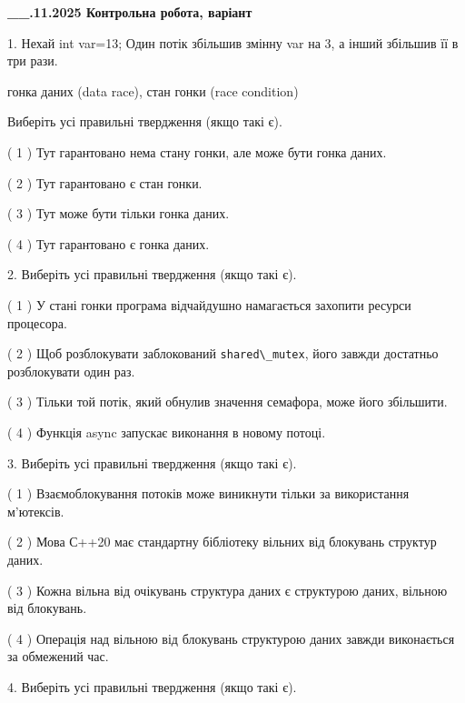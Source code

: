\documentclass[12pt, ukrainian]{article}
\def\code#1{\Verb!#1!}
\begin{document}
\newpage
\begin {large}

\textbf{\_\_.11.2025 Контрольна робота, варіант  }\par


{
1. Нехай int var=13; Один потік збільшив змінну var на 3, а інший збільшив її в три рази.

гонка даних (data race), стан гонки (race condition)

Виберіть усі правильні твердження (якщо такі є).\par
\vspace{2mm}
( 1 ) Тут гарантовано нема стану гонки, але може бути гонка даних.%

( 2 ) Тут гарантовано є стан гонки.%

( 3 ) Тут може бути тільки гонка даних.%

( 4 ) Тут гарантовано є гонка даних.%


2. Виберіть усі правильні твердження (якщо такі є).\par
\vspace{2mm}

( 1 ) У стані гонки програма відчайдушно намагається захопити ресурси процесора.%

( 2 ) Щоб розблокувати заблокований \code{shared\_mutex}, його завжди достатньо розблокувати один раз.%

( 3 ) Тільки той потік, який обнулив значення семафора, може його збільшити.%

( 4 ) Функція async запускає виконання в новому потоці.%


3. Виберіть усі правильні твердження (якщо такі є).\par
\vspace{2mm}

( 1 ) Взаємоблокування потоків може виникнути тільки за використання м’ютексів.%

( 2 ) Мова С++20 має стандартну бібліотеку вільних від блокувань структур даних.%

( 3 ) Кожна вільна від очікувань структура даних є структурою даних, вільною від блокувань.%

( 4 ) Операція над вільною від блокувань структурою даних завжди виконається за обмежений час.%


4. Виберіть усі правильні твердження (якщо такі є).\par
\vspace{2mm}

}
\end{large}
\end{document}
